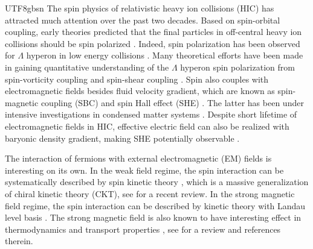\documentclass[11pt]{article}\def\baselinestretch{1.4}
\def\L{{\Lambda}}
\begin{document}
\begin{CJK}{UTF8}{gbsn}
The spin physics of relativistic heavy ion collisions (HIC) has attracted much attention over the past two decades. Based on spin-orbital coupling, early theories predicted that the final particles in off-central heavy ion collisions should be spin polarized \cite{Liang:2004ph,Liang:2004xn}. Indeed, spin polarization has been observed for $\L$ hyperon in low energy collisions \cite{STAR:2017ckg,STAR:2019erd}. Many theoretical efforts have been made in gaining quantitative understanding of the $\L$ hyperon spin polarization from spin-vorticity coupling \cite{Becattini:2013fla, Fang:2016vpj, Li:2017slc, Liu:2019krs, Becattini:2017gcx, Wei:2018zfb, Wu:2019eyi, Fu:2020oxj, Zhang:2019xya, Weickgenannt:2020aaf, Gao:2012ix} and spin-shear coupling \cite{Hidaka:2017auj, Liu:2021uhn, Becattini:2021suc, Fu:2021pok, Becattini:2021iol, Yi:2021ryh, Lin:2022tma}. Spin also couples with electromagnetic fields besides fluid velocity gradient, which are known as spin-magnetic coupling (SBC) and spin Hall effect (SHE) \cite{Liu:2020dxg, Mameda:2022ojk}. The latter has been under intensive investigations in condensed matter systems \cite{RevModPhys.87.1213, PhysRevLett.95.226801}. Despite short lifetime of electromagnetic fields in HIC, effective electric field can also be realized with baryonic density gradient, making SHE potentially observable \cite{Fu:2022oup}.

The interaction of fermions with external electromagnetic (EM) fields is interesting on its own. In the weak field regime, the spin interaction can be systematically described by spin kinetic theory \cite{Gao:2019znl, Weickgenannt:2019dks, Hattori:2019ahi, Liu:2020flb, Sheng:2020oqs,Yang:2020hri,Weickgenannt:2021cuo,Sheng:2021kfc,Lin:2021mvw}, which is a massive generalization of chiral kinetic theory (CKT), see \cite{Hidaka:2022dmn} for a recent review. In the strong magnetic field regime, the spin interaction can be described by kinetic theory with Landau level basis \cite{Sheng:2017lfu, Lin:2019fqo, Hattori:2016lqx, Fukushima:2019ugr}. The strong magnetic field is also known to have interesting effect in thermodynamics and transport properties \cite{Zhang:2020ben,Fang:2021ndj,Fukushima:2015wck,Hattori:2016lqx,Fukushima:2017lvb,Hattori:2017qih,Hattori:2016njk,Lin:2021sjw,Peng:2023rjj}, see \cite{Hattori:2023egw} for a review and references therein. 


\end{CJK}
\end{document}
